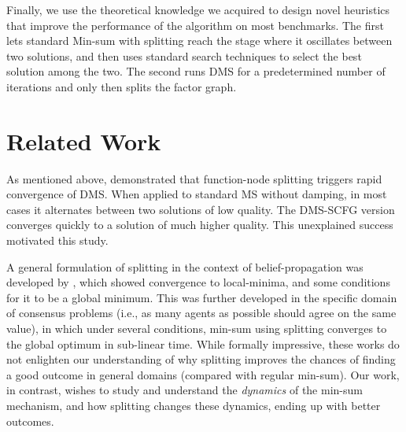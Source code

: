 \documentclass[letterpaper]{article} %
\theoremstyle{definition}
\theoremstyle{remark}
\begin{document}
Finally, we use the theoretical knowledge we acquired to design novel heuristics that improve the performance of the algorithm on most benchmarks. The first lets standard Min-sum with splitting reach the stage where it oscillates between two solutions, and then uses standard search techniques to select the best solution among the two. The second runs DMS for a predetermined number of iterations and only then splits the factor graph.


\section{Related Work}
\label{Sec:related}
As mentioned above, \citet{CohenGZ20} demonstrated that function-node splitting triggers rapid convergence of DMS. When applied to standard MS without damping, in most cases it alternates between two solutions of low quality. The DMS-SCFG version converges quickly to a solution of much higher quality. This unexplained success motivated this study.

A general formulation of splitting in the context of belief-propagation was developed by \citet{ruozzi2013}, which showed convergence to local-minima, and some conditions for it to be a global minimum. This was further developed \cite{rebeschini2017} in the specific domain of consensus problems (i.e., as many agents as possible should agree on the same value), in which under several conditions, min-sum using splitting converges to the global optimum in sub-linear time. While formally impressive, these works do not enlighten our understanding of why splitting improves the chances of finding a good outcome in general domains (compared with regular min-sum). Our work, in contrast, wishes to study and understand the \emph{dynamics} of the min-sum mechanism, and how splitting changes these dynamics, ending up with better outcomes.
\end{document}
